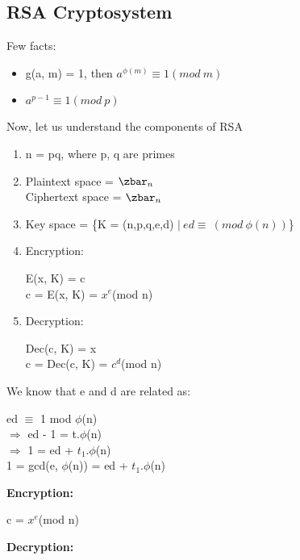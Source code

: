 \documentclass[11pt]{article}
\begin{document}
\subsection{RSA Cryptosystem}
Few facts:
\begin{itemize}
    \item g(a, m) = 1, then $a^{\phi(m)} \equiv 1 (mod\ m)$
    \item $a^{p-1} \equiv 1 (mod \ p)$
\end{itemize}
Now, let us understand the components of RSA
\begin{enumerate}
    \item n = pq, where p, q are primes
    \item Plaintext space =  ${\zbar}_n$\\
    Ciphertext space = ${\zbar}_n$
    \item Key space = \{K = (n,p,q,e,d) $|\ ed \equiv\ (mod \ \phi(n))$\}
    \item Encryption:
    \begin{center}
        E(x, K) = c\\
        c = E(x, K) = $x^e$(mod n)
    \end{center}
    \item Decryption:
    \begin{center}
        Dec(c, K) = x\\
        c = Dec(c, K) = $c^d$(mod n)
    \end{center}
\end{enumerate}
We know that e and d are related as:
\begin{center}
    ed $\equiv$ 1 mod $\phi$(n)\\
    $\Rightarrow$ ed - 1 = t.$\phi$(n)\\
    $\Rightarrow$ 1 = ed + $t_1$.$\phi$(n)\\
    1 = gcd(e, $\phi$(n)) = ed + $t_1$.$\phi$(n)
\end{center}
\textbf{Encryption:}
\begin{center}
    c = $x^e$(mod n)
\end{center}
\textbf{Decryption:}
\end{document}
